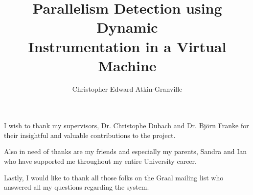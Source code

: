 \documentclass[msc,cs,parskip,leftchapter,logo,twoside,abbrevs,11pt]{infthesis}
\title{Parallelism Detection using Dynamic\\Instrumentation in a Virtual Machine}
\author{Christopher Edward Atkin-Granville}
\begin{document}
	\begin{preliminary}
		\maketitle
		\begin{acknowledgements}
		I wish to thank my supervisors, Dr. Christophe Dubach and Dr. Bj\"{o}rn Franke for their insightful and valuable contributions to the project.

		Also in need of thanks are my friends and especially my parents, Sandra and Ian who have supported me throughout my entire University career.
		
		Lastly, I would like to thank all those folks on the Graal mailing list who answered all my questions regarding the system.
		\end{acknowledgements}
		\standarddeclaration
		\dedication{To my grandfather, Leslie.}
		\tableofcontents
		\listoffigures
	\end{preliminary}

	
	
	
	
	
	
	
	
	
	\appendix
	
	
		

	\singlespace
	
	
\end{document}
